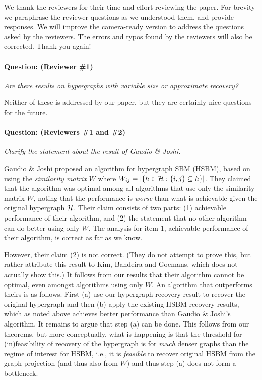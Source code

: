 \documentclass[12pt]{colt2024} %
\begin{document}
We thank the reviewers for their time and effort reviewing the paper. For brevity we paraphrase the reviewer questions as we understood them, and provide responses.  We will improve the camera-ready version to address the questions asked by the reviewers. The errors and typos found by the reviewers will also be corrected. Thank you again!

\paragraph{Question: (Reviewer \#1)} \emph{Are there results on hypergraphs with variable size or approximate recovery?}

 Neither of these is addressed by our paper, but they are certainly nice questions for the future.

\paragraph{Question:  (Reviewers \#1 and \#2)} \emph{Clarify the statement about the result of Gaudio \& Joshi.}

Gaudio \& Joshi proposed an algorithm for hypergraph SBM (HSBM), based on using the \emph{similarity matrix} $W$ where $W_{ij} = |\{h\in \mathcal{H}: \{i,j\}\subseteq h\}|$. They claimed that the algorithm was optimal among all algorithms that use only the similarity matrix $W$, noting that the performance is \emph{worse} than what is achievable given the original hypergraph $\mathcal{H}$. 
Their claim consists of two parts: (1) achievable performance of their algorithm, and (2) the statement that no other algorithm can do better using only $W$. 
The analysis for item 1, achievable performance of their algorithm, is correct as far as we know. 

However, their claim (2) is not correct. (They do not attempt to prove this, but rather attribute this result to Kim, Bandeira and Goemans, which does not actually show this.)
It follows from our results that their algorithm cannot be optimal, even amongst algorithms using only $W$. An algorithm that outperforms theirs is as follows. First (a) use our hypergraph recovery result to recover the original hypergraph and then (b) apply the existing HSBM recovery results, which as noted above achieves better performance than Gaudio \& Joshi's algorithm. It remains to argue that step (a) can be done. This follows from our theorems, but more conceptually, what is happening is that the threshold for (in)feasibility of recovery of the hypergraph is for \emph{much} denser graphs than the regime of interest for HSBM, i.e., it is \emph{feasible} to recover original HSBM from the graph projection (and thus also from $W$) and thus step (a) does not form a bottleneck.
\end{document}
